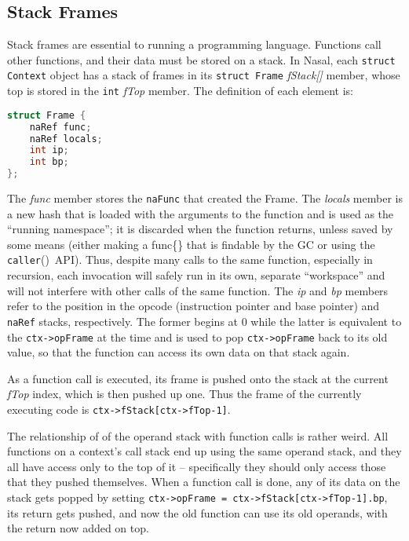 \documentclass{article}
\newcommand{\name}[1]{{\it #1}}
\newcommand{\type}[1]{\textcolor{type}{\tt #1}}
\newcommand{\func}[1]{\textcolor{func}{\tt #1}}
\newcommand{\nasalkeyword}[1]{\textcolor{keyword}{#1}}
\newcommand{\br}{\penalty3}
\newcommand{\fp}{\textcolor{func}{()}}
\begin{document}
\subsection{Stack Frames}
Stack frames are essential to running a programming language.  Functions call other functions, and their data must be stored on a stack.  In Nasal, each \type{struct Context} object has a stack of frames in its \type{struct Frame} \name{fStack[]} member, whose top is stored in the \type{int} \name{fTop} member.  The definition of each element is:
\begin{lstlisting}[language=C]
struct Frame {
    naRef func;
    naRef locals;
    int ip;
    int bp;
};
\end{lstlisting}

The \name{func} member stores the \type{naFunc} that created the Frame.  The \name{locals} member is a new hash that is loaded with the arguments to the function and is used as the ``running namespace''; it is discarded when the function returns, unless saved by some means (either making a \nasalkeyword{func}\{\} that is findable by the GC or using the \func{caller}\fp\ API).  Thus, despite many calls to the same function, especially in recursion, each invocation will safely run in its own, separate ``workspace'' and will not interfere with other calls of the same function.  The \name{ip} and \name{bp} members refer to the position in the opcode (instruction pointer and base pointer) and \type{naRef} stacks, respectively.  The former begins at 0 while the latter is equivalent to the \verb$ctx->opFrame$ at the time and is used to pop \verb$ctx->opFrame$ back to its old value, so that the function can access its own data on that stack again.

As a function call is executed, its frame is pushed onto the stack at the current \name{fTop} index, which is then pushed up one.  Thus the frame of the currently executing code is \verb$ctx->fStack[ctx->fTop-1]$.

The relationship of of the operand stack with function calls is rather weird.  All functions on a context's call stack end up using the same operand stack, and they all have access only to the top of it -- specifically they should only access those that they pushed themselves.  When a function call is done, any of its data on the stack gets popped by setting \verb$ctx->$\br\verb$opFrame$\br\verb$ = $\br\verb$ctx->$\br\verb$fStack$\br\verb$[ctx->fTop$\br\verb$-1]$\br\verb$.bp$, its return gets pushed, and now the old function can use its old operands, with the return now added on top.
\end{document}
